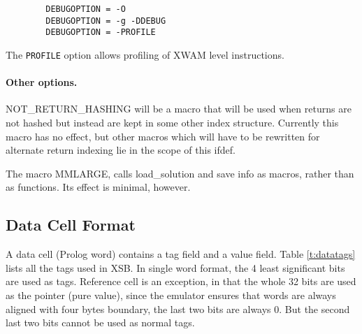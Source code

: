 \documentclass[11pt]{article}
\begin{document}
\begin{verbatim}
        DEBUGOPTION = -O
        DEBUGOPTION = -g -DDEBUG
        DEBUGOPTION = -PROFILE
\end{verbatim}

The {\tt PROFILE} option allows profiling of XWAM level instructions.


\paragraph{Other options. }

NOT\_RETURN\_HASHING will be a macro that will be used when returns are
not hashed but instead are kept in some other index structure.
Currently this macro has no effect, but other macros which will have
to be rewritten for alternate return indexing lie in the scope of this
ifdef.

The macro MMLARGE, calls load\_solution and save info as macros, rather
than as functions.  Its effect is minimal, however.

\subsection{Data Cell Format}

A data cell (Prolog word) contains a tag field and a value field.
Table \ref{t:datatags} lists all the tags used in XSB.
In single word format, the 4 least significant bits are used
as tags. Reference cell is an exception, in that the whole 32 bits
are used as the pointer (pure value), since the emulator ensures that
words are always aligned with four bytes boundary, the last two bits
are always 0. But the second last two bits cannot be used as normal tags.
\end{document}
